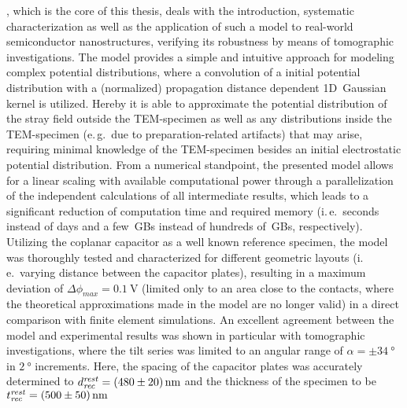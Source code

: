 , which is the core of this thesis, deals with the introduction, systematic characterization as well as the application of such a model to real-world semiconductor nanostructures, verifying its robustness by means of tomographic investigations. The model provides a simple and intuitive approach for modeling complex potential distributions, where a convolution of a initial potential distribution with a (normalized) propagation distance dependent 1D~Gaussian kernel is utilized. Hereby it is able to approximate the potential distribution of the stray field outside the TEM-specimen as well as any distributions inside the TEM-specimen (e.\,g.\ due to preparation-related artifacts) that may arise, requiring minimal knowledge of the TEM-specimen besides an initial electrostatic potential distribution. From a numerical standpoint, the presented model allows for a linear scaling with available computational power through a parallelization of the independent calculations of all intermediate results, which leads to a significant reduction of computation time and required memory (i.\,e.\ seconds instead of days and a few~GBs instead of hundreds of~GBs, respectively). Utilizing the coplanar capacitor as a well known reference specimen, the model was thoroughly tested and characterized for different geometric layouts (i.\,e.\ varying distance between the capacitor plates), resulting in a maximum deviation of $\Delta \phi_{\mathit{max}} = \SI{0.1}{\volt}$ (limited only to an area close to the contacts, where the theoretical approximations made in the model are no longer valid) in a direct comparison with finite element simulations. An excellent agreement between the model and experimental results was shown in particular with tomographic investigations, where the tilt series was limited to an angular range of $\alpha = \pm \SI{34}{\degree}$ in $\SI{2}{\degree}$ increments. Here, the spacing of the capacitor plates was accurately determined to $d_{\mathit{rec}}^{\mathit{rest}} = \SI{480 \pm 20}{\nm}$ and the thickness of the specimen to be $t_{\mathit{rec}}^{\mathit{rest}} = \SI{500 \pm 50}{\nm}$

